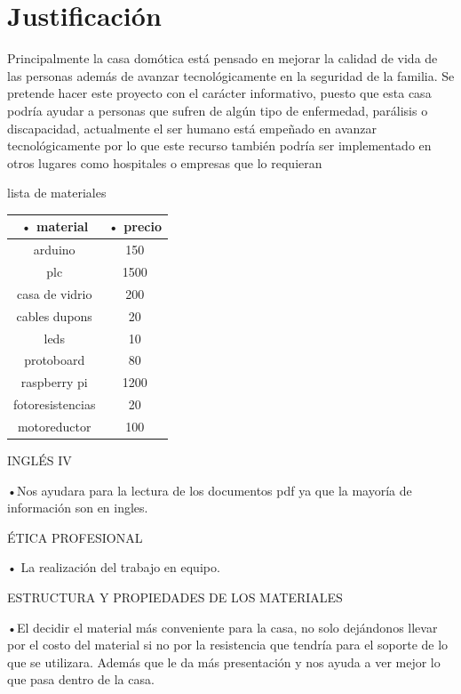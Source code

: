 \documentclass[12pt,a4paper]{article}
\begin{document}
\section{Justificación}
Principalmente la casa domótica está pensado en mejorar la calidad de vida de las personas además de avanzar tecnológicamente en la seguridad de la familia. Se pretende hacer este proyecto con el carácter informativo, puesto que esta casa podría ayudar a personas que sufren de algún tipo de enfermedad, parálisis o discapacidad, actualmente el ser humano está empeñado en avanzar tecnológicamente por lo que este recurso también podría ser implementado en otros lugares como hospitales o empresas que lo requieran
\begin{flushleft}
lista de materiales
\end{flushleft}
\begin{tabular}{|c|c|}
\hline 
• material & • precio \\ 
\hline 
arduino & 150 \\ 
\hline 
plc & 1500 \\ 
\hline 
casa de vidrio & 200 \\ 
\hline 
cables dupons & 20 \\ 
\hline 
leds & 10 \\ 
\hline 
protoboard & 80 \\ 
\hline 
raspberry pi & 1200 \\ 
\hline 
fotoresistencias  & 20 \\ 
\hline 
motoreductor & 100 \\ 
\hline 
\end{tabular} 
\begin{flushleft}
INGLÉS IV
\begin{center}
•Nos ayudara para la lectura de los documentos pdf  ya que la mayoría de información son en ingles.
\begin{flushleft}
ÉTICA PROFESIONAL
\end{flushleft}
\end{center}
\begin{center}
• La realización del trabajo en equipo.
\end{center}
\end{flushleft}
\begin{flushleft}
ESTRUCTURA Y PROPIEDADES DE LOS MATERIALES
\end{flushleft}
\begin{center}
•El decidir el material más conveniente para la casa, no solo dejándonos llevar por el costo del material si no por la resistencia que tendría para el soporte de lo que se utilizara. Además que le da más presentación y nos ayuda a ver mejor lo que pasa dentro de la casa.
\end{center}
\end{document}
